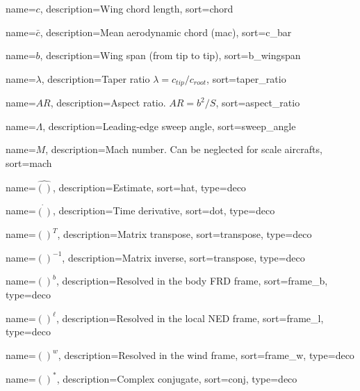 {
	name={$c$},
	description={Wing chord length},
	sort=chord
}

{
	name={$\bar{c}$},
	description={Mean aerodynamic chord (mac)},
	sort=c_bar
}

{
	name={$b$},
	description={Wing span (from tip to tip)},
	sort=b_wingspan
}

{
	name={$\lambda$},
	description={Taper ratio $\lambda = c_{tip}/c_{root}$},
	sort=taper_ratio
}

{
	name={$AR$},
	description={Aspect ratio. $AR = b^2/S$},
	sort=aspect_ratio
}

{
	name={$\Lambda$},
	description={Leading-edge sweep angle},
	sort=sweep_angle
}

{
	name={$M$},
	description={Mach number. Can be neglected for scale aircrafts},
	sort=mach
}


{
	name={$\hat{()}$},
	description={Estimate},
	sort=hat,
	type=deco
}

{
	name={$\dot{()}$},
	description={Time derivative},
	sort=dot,
	type=deco
}

{
	name={$()^T$},
	description={Matrix transpose},
	sort=transpose,
	type=deco
}

{
	name={$()^{-1}$},
	description={Matrix inverse},
	sort=transpose,
	type=deco
}

{
	name={$()^b$},
	description={Resolved in the body FRD frame},
	sort=frame_b,
	type=deco
}

{
	name={$()^\ell$},
	description={Resolved in the local NED frame},
	sort=frame_l,
	type=deco
}

{
	name={$()^w$},
	description={Resolved in the wind frame},
	sort=frame_w,
	type=deco
}

{
	name={$()^*$},
	description={Complex conjugate},
	sort=conj,
	type=deco
}

